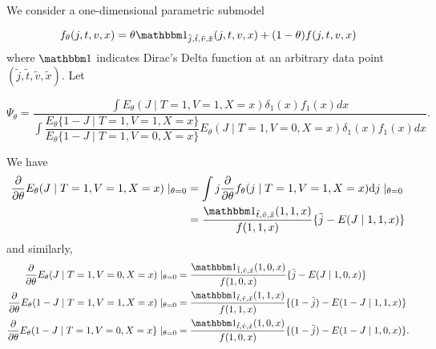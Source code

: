 \documentclass{article}
\begin{document}
We consider a one-dimensional parametric submodel

$$f_\theta(j, t, v, x)=\theta \mathbbm 1_{\tilde j, \tilde t, \tilde v, \tilde x}(j, t, v, x) + (1-\theta)f(j, t, v,x)$$
where $\mathbbm 1$ indicates Dirac's Delta function at an arbitrary data point $(\tilde j, \tilde t, \tilde v, \tilde x)$. Let

$$\Psi_\theta = \dfrac{\int E_\theta(J\mid T=1, V=1, X=x)\delta_1(x)f_1(x)dx}{\int \dfrac{E_\theta\{1-J\mid T=1, V=1, X=x\}}{E_\theta\{1-J\mid T=1, V=0, X=x\}} E_\theta(J\mid T=1, V=0, X=x)\delta_1(x)f_1(x)dx}.$$

We have
\begin{align*}
    \dfrac{\partial}{\partial\theta}E_\theta(J\mid T=1, V=1, X=x)\mid_{\theta=0} &= \int j \dfrac{\partial}{\partial\theta}f_\theta(j\mid T=1, V=1, X=x)\mathrm d j\mid_{\theta = 0}\\
    &= \dfrac{\mathbbm 1_{\tilde t,\tilde v, \tilde x}(1, 1, x)}{f(1, 1, x)}\{\tilde j - E(J\mid 1, 1, x)\}
\end{align*}
and similarly,
\begin{align*}
     \dfrac{\partial}{\partial\theta}E_\theta(J\mid T=1, V=0, X=x)\mid_{\theta=0} &= \dfrac{\mathbbm 1_{\tilde 1,\tilde v, \tilde x}(1, 0, x)}{f(1, 0, x)}\{\tilde j - E(J\mid 1, 0, x)\}\\
      \dfrac{\partial}{\partial\theta}E_\theta(1-J\mid T=1, V=1, X=x)\mid_{\theta=0} &= \dfrac{\mathbbm 1_{\tilde t,\tilde v, \tilde x}(1, 1, x)}{f(1, 1, x)}\{(1-\tilde j) - E(1-J\mid 1, 1, x)\}\\
        \dfrac{\partial}{\partial\theta}E_\theta(1-J\mid T=1, V=0, X=x\}\mid_{\theta=0} &= \dfrac{\mathbbm 1_{\tilde t,\tilde v, \tilde x}(1, 0, x)}{f(1, 0, x)}\{(1-\tilde j) - E(1-J\mid 1, 0, x)\}.
\end{align*}
\end{document}
